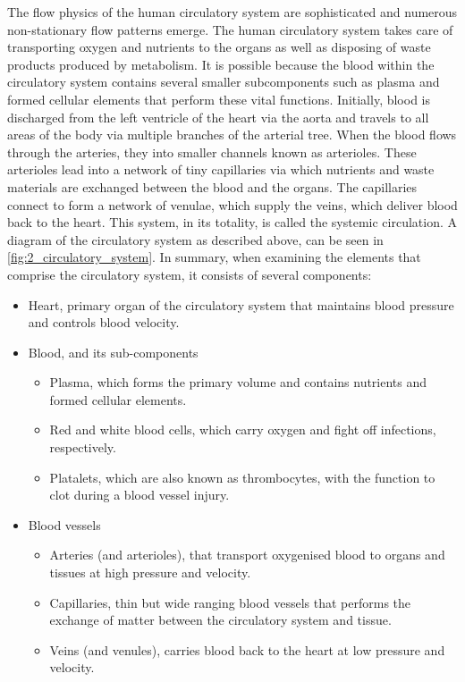 The flow physics of the human circulatory system are sophisticated and numerous non-stationary flow patterns emerge. The human circulatory system takes care of transporting oxygen and nutrients to the organs as well as disposing of waste products produced by metabolism. It is possible because the blood within the circulatory system contains several smaller subcomponents such as plasma and formed cellular elements that perform these vital functions. Initially, blood is discharged from the left ventricle of the heart via the aorta and travels to all areas of the body via multiple branches of the arterial tree. When the blood flows through the arteries, they into smaller channels known as arterioles. These arterioles lead into a network of tiny capillaries via which nutrients and waste materials are exchanged between the blood and the organs. The capillaries connect to form a network of venulae, which supply the veins, which deliver blood back to the heart. This system, in its totality, is called the systemic circulation. A diagram of the circulatory system as described above, can be seen in \cref{fig:2_circulatory_system}. In summary, when examining the elements that comprise the circulatory system, it consists of several components:
\begin{itemize}
	\item Heart, primary organ of the circulatory system that maintains blood pressure and controls blood velocity.
	\item Blood, and its sub-components
	\begin{itemize}
		\item Plasma, which forms the primary volume and contains nutrients and formed cellular elements.
		\item Red and white blood cells, which carry oxygen and fight off infections, respectively.
		\item Platalets, which are also known as thrombocytes, with the function to clot during a blood vessel injury.
	\end{itemize}
	\item Blood vessels
	\begin{itemize}
		\item Arteries (and arterioles), that transport oxygenised blood to organs and tissues at high pressure and velocity.
		\item Capillaries, thin but wide ranging blood vessels that performs the exchange of matter between the circulatory system and tissue.
		\item Veins (and venules), carries blood back to the heart at low pressure and velocity.
	\end{itemize}
\end{itemize}

